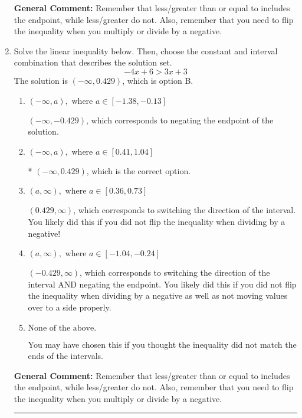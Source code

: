 \documentclass{extbook}[14pt]
\newcommand{\litem}[1]{\item #1

\rule{\textwidth}{0.4pt}}
\begin{document}
\begin{enumerate}
{\textbf{General Comment:} Remember that less/greater than or equal to includes the endpoint, while less/greater do not. Also, remember that you need to flip the inequality when you multiply or divide by a negative.
}
\litem{
Solve the linear inequality below. Then, choose the constant and interval combination that describes the solution set.
\[ -4x + 6 > 3x + 3 \]The solution is \( (-\infty, 0.429) \), which is option B.\begin{enumerate}[label=\Alph*.]
\item \( (-\infty, a), \text{ where } a \in [-1.38, -0.13] \)

 $(-\infty, -0.429)$, which corresponds to negating the endpoint of the solution.
\item \( (-\infty, a), \text{ where } a \in [0.41, 1.04] \)

* $(-\infty, 0.429)$, which is the correct option.
\item \( (a, \infty), \text{ where } a \in [0.36, 0.73] \)

 $(0.429, \infty)$, which corresponds to switching the direction of the interval. You likely did this if you did not flip the inequality when dividing by a negative!
\item \( (a, \infty), \text{ where } a \in [-1.04, -0.24] \)

 $(-0.429, \infty)$, which corresponds to switching the direction of the interval AND negating the endpoint. You likely did this if you did not flip the inequality when dividing by a negative as well as not moving values over to a side properly.
\item \( \text{None of the above}. \)

You may have chosen this if you thought the inequality did not match the ends of the intervals.
\end{enumerate}

\textbf{General Comment:} Remember that less/greater than or equal to includes the endpoint, while less/greater do not. Also, remember that you need to flip the inequality when you multiply or divide by a negative.
}
\end{enumerate}
\end{document}
